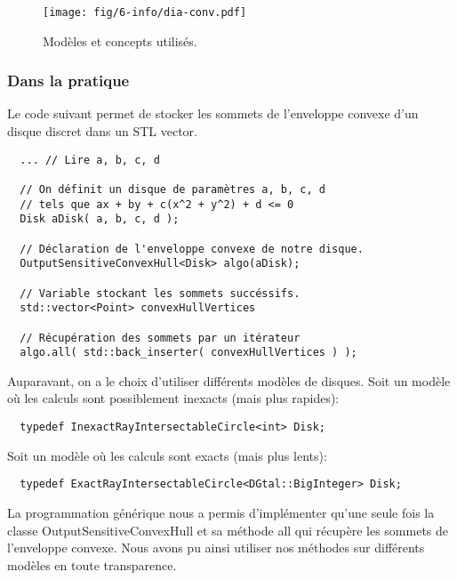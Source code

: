 \begin{figure}[H]
  \centering
  \texttt{[image: fig/6-info/dia-conv.pdf]}
  \caption{Modèles et concepts utilisés.}
\end{figure}


\subsubsection{Dans la pratique}

Le code suivant permet de stocker les sommets de l'enveloppe convexe
d'un disque discret dans un STL vector. 

\begin{verbatim}
  ... // Lire a, b, c, d

  // On définit un disque de paramètres a, b, c, d
  // tels que ax + by + c(x^2 + y^2) + d <= 0
  Disk aDisk( a, b, c, d );	 
  
  // Déclaration de l'enveloppe convexe de notre disque.
  OutputSensitiveConvexHull<Disk> algo(aDisk);
  
  // Variable stockant les sommets succéssifs.
  std::vector<Point> convexHullVertices
  
  // Récupération des sommets par un itérateur 
  algo.all( std::back_inserter( convexHullVertices ) );  
\end{verbatim}

Auparavant, on a le choix d'utiliser différents modèles de disques. 
Soit un modèle où les calculs sont possiblement inexacts (mais plus rapides): 
\begin{verbatim}
  typedef InexactRayIntersectableCircle<int> Disk;
\end{verbatim}
Soit un modèle où les calculs sont exacts (mais plus lents):
\begin{verbatim}
  typedef ExactRayIntersectableCircle<DGtal::BigInteger> Disk;
\end{verbatim}

La programmation générique nous a permis d'implémenter qu'une seule fois la classe OutputSensitiveConvexHull et sa méthode all qui récupère les sommets de l'enveloppe convexe. Nous avons pu ainsi utiliser nos méthodes sur différents modèles en toute transparence. 

